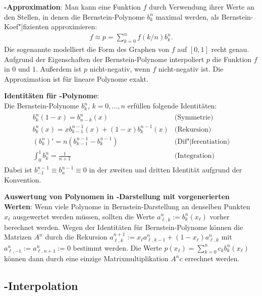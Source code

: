 \linie

\textbf{-Approximation}:
Man kann eine Funktion $f$ durch Verwendung ihrer Werte an den Stellen, in denen die
Bernstein-Polynome $b_k^n$ maximal werden, als Bernstein-Koef"|fizienten approximieren:
\begin{align*}
    f \approx p = \sum_{k=0}^n f(k/n) b_k^n.
\end{align*}
Die sogenannte  modelliert
die Form des Graphen von $f$ auf $[0, 1]$ recht genau.
Aufgrund der Eigenschaften der Bernstein-Polynome interpoliert $p$ die Funktion $f$ in $0$ und $1$.
Außerdem ist $p$ nicht-negativ, wenn $f$ nicht-negativ ist.
Die Approximation ist für lineare Polynome exakt.

\linie
\pagebreak

\textbf{Identitäten für -Polynome}:\\
Die Bernstein-Polynome $b_k^n$, $k = 0, \dots, n$ erfüllen folgende Identitäten:
\begin{align*}
    \begin{array}{cl}
        b_k^n(1 - x) = b_{n-k}^n(x) & \text{(Symmetrie)}\\[2mm]
        b_k^n(x) = x b_{k-1}^{n-1}(x) + (1 - x) b_k^{n-1}(x) & \text{(Rekursion)}\\[2mm]
        (b_k^n)' = n (b_{k-1}^{n-1} - b_k^{n-1}) & \text{(Dif"|ferentiation)}\\[2mm]
        \int_0^1 b_k^n = \frac{1}{n+1} & \text{(Integration)}
    \end{array}
\end{align*}
Dabei ist $b_{-1}^{n-1} \equiv b_n^{n-1} \equiv 0$ in der zweiten und dritten Identität
aufgrund der Konvention.

\linie

\textbf{Auswertung von Polynomen in -Darstellung mit vorgenerierten Werten}:
Wenn viele Polynome in Bernstein-Darstellung an denselben Punkten $x_\ell$ ausgewertet
werden müssen, sollten die Werte $a_{\ell,k}^n := b_k^n(x_\ell)$ vorher berechnet werden.
Wegen der Identitäten für Bernstein-Polynome können die Matrizen $A^n$ durch die Rekursion
$a_{\ell,k}^{n+1} := x_\ell a_{\ell,k-1}^n + (1 - x_\ell) a_{\ell,k}^n$
mit $a_{\ell,-1}^n := a_{\ell,n+1}^n := 0$ bestimmt werden.
Die Werte $p(x_\ell) = \sum_{k=0}^n c_k b_k^n(x_\ell)$ können dann durch eine einzige
Matrixmultiplikation $A^n c$ errechnet werden.

\subsection{%
    -Interpolation%
}

